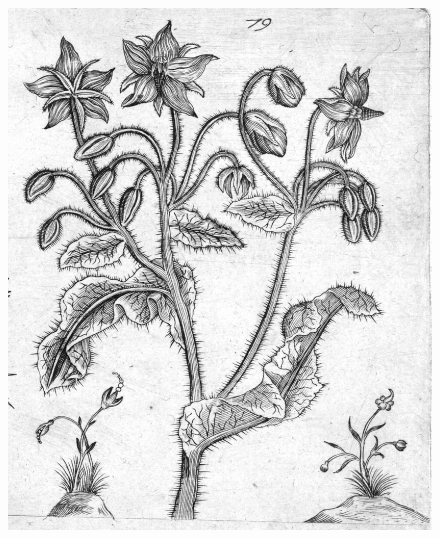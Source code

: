 {\clearpage{}
\null\vfill
\begin{figure}[H]
\centering
\includegraphics[keepaspectratio,width=\textwidth]{figures/borage-small.jpg}
\caption{}
\label{fig:borage}
\end{figure}
\vfill
\clearpage{}

}
